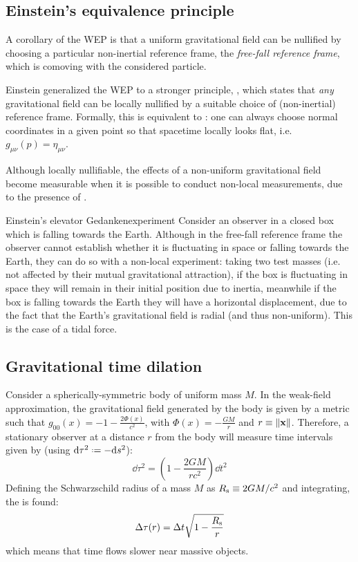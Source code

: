 \subsection{Einstein's equivalence principle}

A corollary of the WEP is that a uniform gravitational field can be nullified by choosing a particular non-inertial reference frame, the \emph{free-fall reference frame}, which is comoving with the considered particle.

Einstein generalized the WEP to a stronger principle, , which states that \emph{any} gravitational field can be locally nullified by a suitable choice of (non-inertial) reference frame. Formally, this is equivalent to : one can always choose normal coordinates in a given point so that spacetime locally looks flat, i.e. $ g_{\mu \nu}(p) = \eta_{\mu \nu} $.

Although locally nullifiable, the effects of a non-uniform gravitational field become measurable when it is possible to conduct non-local measurements, due to the presence of .

\begin{example}{Einstein's elevator Gedankenexperiment}{}
  Consider an observer in a closed box which is falling towards the Earth. Although in the free-fall reference frame the observer cannot establish whether it is fluctuating in space or falling towards the Earth, they can do so with a non-local experiment: taking two test masses (i.e. not affected by their mutual gravitational attraction), if the box is fluctuating in space they will remain in their initial position due to inertia, meanwhile if the box is falling towards the Earth they will have a horizontal displacement, due to the fact that the Earth's gravitational field is radial (and thus non-uniform). This is the case of a tidal force.
\end{example}

\subsection{Gravitational time dilation}

Consider a spherically-symmetric body of uniform mass $ M $. In the weak-field approximation, the gravitational field generated by the body is given by a metric such that $ g_{00}(x) = - 1 - \frac{2 \Phi(x)}{c^2} $, with $ \Phi(x) = - \frac{GM}{r} $ and $ r \equiv \left\lVert\mathbf{x}\right\rVert $. Therefore, a stationary observer at a distance $ r $ from the body will measure time intervals given by (using $ \dd \tau^2 \defeq - \dd s^2 $):
\begin{equation*}
  \dd \tau^2 = \left( 1 - \frac{2GM}{rc^2} \right) \dd t^2
\end{equation*}
Defining the Schwarzschild radius of a mass $ M $ as $ R_\text{s} \equiv 2GM / c^2 $ and integrating, the  is found:
\begin{equation}
  \Delta \tau(r) = \Delta t \sqrt{1 - \frac{R_\text{s}}{r}}
  \label{eq:gravitational-time-dilation}
\end{equation}
which means that time flows slower near massive objects.

